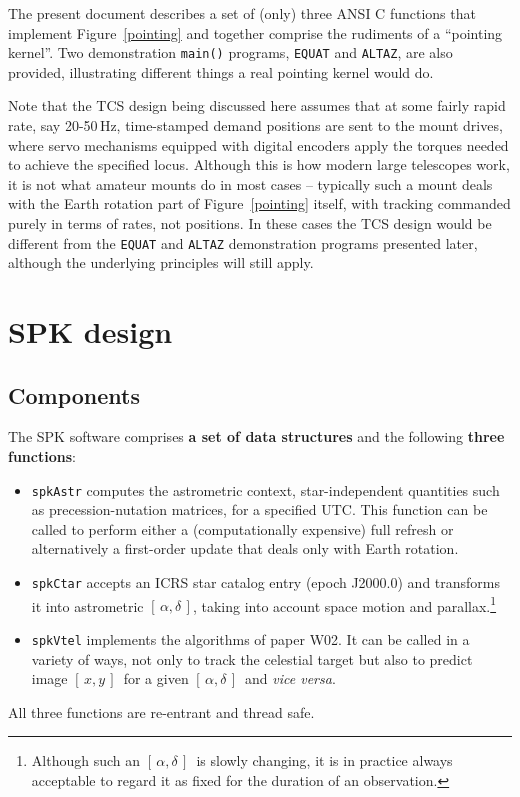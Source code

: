 \documentclass[11pt,fleqn,twoside,\paper]{article}
\renewcommand{\_}{{\tt\char'137}}     %
\newcommand{\radec}     {$[\,\alpha,\delta\,]$}
\newcommand{\xy}        {$[\,x,y\,]$}
\begin{document}
The present document describes a set of (only) three ANSI C
functions that implement Figure~\ref{pointing} and together
comprise the rudiments of a
``pointing kernel''.  Two demonstration {\tt main()} programs,
{\tt EQUAT} and {\tt ALTAZ}, are also provided, illustrating
different things a real pointing kernel would do.

Note that the TCS design being discussed here assumes that at
some fairly rapid rate, say 20-50\,Hz, time-stamped demand
positions are sent to the mount drives, where servo mechanisms
equipped with digital encoders
apply the torques needed to achieve the
specified locus.  Although this is how modern large telescopes
work, it is not what amateur mounts do in most cases --
typically such a mount deals with the Earth rotation part
of Figure~\ref{pointing} itself, with tracking commanded
purely in terms of rates, not positions.  In these cases
the TCS design would be different from the
{\tt EQUAT} and {\tt ALTAZ} demonstration
programs presented later, although the underlying principles
will still apply.

\section{SPK design}
\label{design}
\subsection{Components}
\label{components}
The SPK software comprises {\bf a set of data structures}
and the following {\bf three functions}:
\begin{itemize}
\item {\tt spkAstr} computes the astrometric context,
star-independent quantities such as precession-nutation matrices,
for a specified UTC.  This function can be called to
perform either a (computationally expensive) full refresh or
alternatively a first-order update that deals only with
Earth rotation.
\item {\tt spkCtar} accepts an ICRS star catalog entry (epoch J2000.0)
and transforms it into astrometric \radec, taking into
account space motion and parallax.\footnote{Although such an \radec\
is slowly changing, it is in practice always acceptable to regard it
as fixed for the duration of an observation.}
\item {\tt spkVtel} implements the algorithms of paper W02.  It can be
called in a variety of ways, not only to
track the celestial target but also to predict image \xy\ for a given
\radec\ and {\it vice versa}.
\end{itemize}
All three functions are re-entrant and thread safe.
\end{document}
